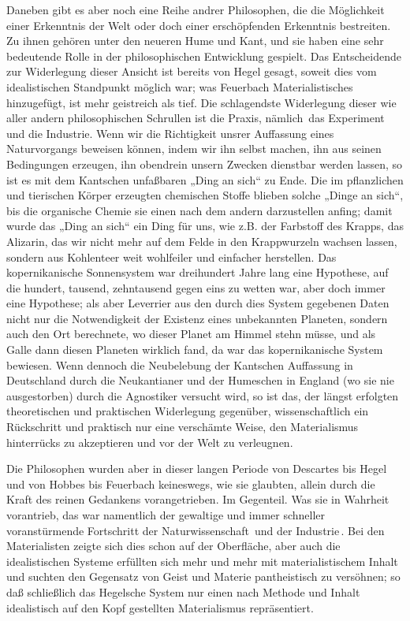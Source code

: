 Daneben gibt es aber noch eine Reihe andrer Philosophen, die die
Möglichkeit einer Erkenntnis der Welt oder doch einer erschöpfenden
Erkenntnis bestreiten. Zu ihnen gehören unter den neueren Hume und Kant,
und sie haben eine sehr bedeutende Rolle in der philosophischen
Entwicklung gespielt. Das Entscheidende zur Widerlegung dieser Ansicht
ist bereits von Hegel gesagt, soweit dies vom idealistischen Standpunkt
möglich war; was Feuerbach Materialistisches hinzugefügt, ist mehr
geistreich als tief. Die schlagendste Widerlegung dieser wie aller
andern philosophischen Schrullen ist die Praxis, nämlich\est\ das Experiment
und die Industrie. Wenn wir die Richtigkeit unsrer Auffassung eines
Naturvorgangs beweisen können, indem wir ihn selbst machen, ihn aus
seinen Bedingungen erzeugen, ihn obendrein unsern Zwecken dienstbar
werden lassen, so ist es mit dem Kantschen unfaßbaren „Ding an sich`` zu
Ende. Die im pflanzlichen und tierischen Körper erzeugten chemischen
Stoffe blieben solche „Dinge an sich``, bis die organische Chemie sie
einen nach dem andern darzustellen anfing; damit wurde das „Ding an
sich`` ein Ding für uns, wie z.B. der Farbstoff des Krapps, das Alizarin,
das wir nicht mehr auf dem Felde in den Krappwurzeln wachsen lassen,
sondern aus Kohlenteer weit wohlfeiler und einfacher herstellen. Das
kopernikanische Sonnensystem war dreihundert Jahre lang eine Hypothese,
auf die hundert, tausend, zehntausend gegen eins zu wetten war, aber
doch immer eine Hypothese; als aber Leverrier aus den durch dies System
gegebenen Daten nicht nur die Notwendigkeit der Existenz eines
unbekannten Planeten, sondern auch den Ort berechnete, wo dieser Planet
am Himmel stehn müsse, und als Galle dann diesen Planeten wirklich fand,
da war das kopernikanische System bewiesen. Wenn dennoch die Neubelebung
der Kantschen Auffassung in Deutschland durch die Neukantianer und der
Humeschen in England (wo sie nie ausgestorben) durch die Agnostiker
versucht wird, so ist das, der längst erfolgten theoretischen und
praktischen Widerlegung gegenüber, wissenschaftlich ein Rückschritt und
praktisch nur eine verschämte Weise, den Materialismus hinterrücks zu
akzeptieren und vor der Welt zu verleugnen.

Die Philosophen wurden aber in dieser langen Periode von
Descartes bis Hegel und von Hobbes bis Feuerbach keineswegs, wie sie
glaubten, allein durch die Kraft des reinen Gedankens vorangetrieben. Im
Gegenteil. Was sie in Wahrheit vorantrieb, das war namentlich der
gewaltige und immer schneller voranstürmende Fortschritt der
Naturwissenschaft \textbar{}\,und der Industrie\,\textbar{}. Bei den Materialisten zeigte
sich dies schon auf der Oberfläche, aber auch die idealistischen Systeme
erfüllten sich mehr und mehr mit materialistischem Inhalt und suchten
den Gegensatz von Geist und Materie pantheistisch zu versöhnen; so daß
schließlich das Hegelsche System nur einen nach Methode und Inhalt
idealistisch auf den Kopf gestellten Materialismus repräsentiert.

